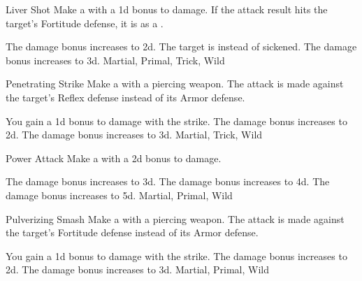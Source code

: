 \lowercase{\hypertarget{maneuver:Liver Shot}{}}\label{maneuver:Liver Shot}
\begin{apability}{\hypertarget{maneuver:Liver Shot}{Liver Shot}}
Make a  with a \plus1d bonus to damage.
If the attack result hits the target's Fortitude defense,
it is  as a .

\rankline
{} The damage bonus increases to \plus2d.
 The target is  instead of sickened.
 The damage bonus increases to \plus3d.
 Martial, Primal, Trick, Wild
\end{apability}
\vspace{0.25em}



\lowercase{\hypertarget{maneuver:Penetrating Strike}{}}\label{maneuver:Penetrating Strike}
\begin{apability}{\hypertarget{maneuver:Penetrating Strike}{Penetrating Strike}}
Make a  with a piercing weapon.
The attack is made against the target's Reflex defense instead of its Armor defense.

\rankline
{} You gain a \plus1d bonus to damage with the strike.
 The damage bonus increases to \plus2d.
 The damage bonus increases to \plus3d.
 Martial, Trick, Wild
\end{apability}
\vspace{0.25em}



\lowercase{\hypertarget{maneuver:Power Attack}{}}\label{maneuver:Power Attack}
\begin{apability}{\hypertarget{maneuver:Power Attack}{Power Attack}}
Make a  with a \plus2d bonus to damage.

\rankline
{} The damage bonus increases to \plus3d.
 The damage bonus increases to \plus4d.
 The damage bonus increases to \plus5d.
 Martial, Primal, Wild
\end{apability}
\vspace{0.25em}



\lowercase{\hypertarget{maneuver:Pulverizing Smash}{}}\label{maneuver:Pulverizing Smash}
\begin{apability}{\hypertarget{maneuver:Pulverizing Smash}{Pulverizing Smash}}
Make a  with a piercing weapon.
The attack is made against the target's Fortitude defense instead of its Armor defense.

\rankline
{} You gain a \plus1d bonus to damage with the strike.
 The damage bonus increases to \plus2d.
 The damage bonus increases to \plus3d.
 Martial, Primal, Wild
\end{apability}
\vspace{0.25em}



